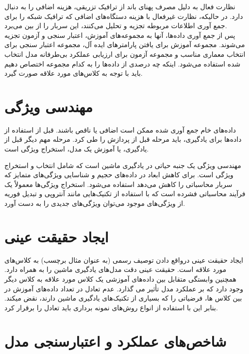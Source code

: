 نظارت فعال به دلیل مصرف پهنای باند از ترافیک تزریقی، هزینه اضافی را به دنبال دارد. در حالیکه، نظارت غیرفعال با هزینه دستگاه‌های اضافی که ترافیک شبکه را برای جمع آوری اطلاعات مربوطه تجزیه و تحلیل می‌کنند، این سربار را از بین می‌برد\cite{ boutaba2018comprehensive}.
\\
پس از جمع آوری داده‌ها، آنها به مجموعه‌های آموزش، اعتبار سنجی و آزمون تجزیه می‌شوند. مجموعه آموزش برای یافتن پارامترهای ایده آل، مجموعه اعتبار سنجی برای انتخاب معماری مناسب و مجموعه آزمون برای ارزیابی عملکرد بی‌طرفانه مدل انتخاب شده استفاده می‌شود. اینکه چه درصدی از داده‌ها را به کدام مجموعه اختصاص دهیم باید با توجه به کلاس‌های مورد علاقه صورت گیرد.
\newpage

\section{مهندسی ویژگی}



داده‌های خام جمع آوری شده ممکن است اضافی یا ناقص باشند. قبل از استفاده از داده‌ها برای یادگیری، باید مرحله قبل از پردازش را طی کرد. مرحله مهم دیگر قبل از یادگیری، یا آموزش یک مدل، استخراج ویژگی است.


مهندسی ویژگی یک جنبه حیاتی در یادگیری ماشین است که شامل انتخاب و استخراج ویژگی است. برای کاهش ابعاد در داده‌های حجیم و شناسایی ویژگی‌های متمایز که سربار محاسباتی را کاهش می‌دهد استفاده می‌شود. استخراج ویژگی‌ها معمولاً یک فرآیند محاسباتی فشرده است که با استفاده از تکنیک‌هایی مانند آنتروپی و تبدیل فوریه از ویژگی‌های موجود می‌توان ویژگی‌های جدیدی را به دست آورد\cite{ boutaba2018comprehensive}.


\section{ایجاد حقیقت عینی}


ایجاد حقیقت عینی درواقع دادن توصیف رسمی (به عنوان مثال برچسب) به کلاس‌های مورد علاقه است. حقیقت عینی دقت مدل‌های یادگیری ماشین را به همراه دارد. همچنین وابستگی متقابل بین داده‌های آموزشی یک کلاس مورد علاقه به کلاس دیگر وجود دارد که بر عملکرد مدل تأثیر می گذارد. عدم تعادل در تعداد داده‌های آموزش در بین کلاس ها، فرضیاتی را که بسیاری از تکنیک‌های یادگیری ماشین دارند، نقض میکند. بنابر این با استفاده از انواع روش‌های نمونه برداری باید تعادل را برقرار کرد\cite{ boutaba2018comprehensive}.



\section{شاخص‌های عملکرد و اعتبارسنجی مدل}

